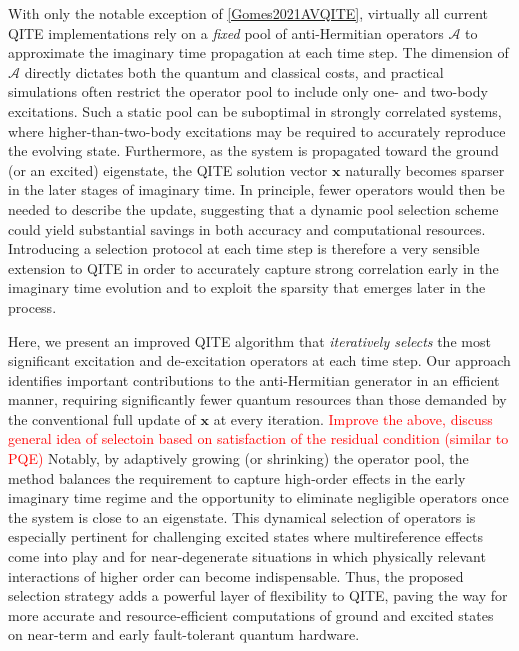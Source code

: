 \documentclass[aip,jcp,amsmath,amssymb, reprint]{revtex4-1}
\begin{document}
With only the notable exception of \ref{Gomes2021AVQITE}, virtually all current QITE implementations rely on a \textit{fixed} pool of anti-Hermitian operators $\mathcal{A}$ to approximate the imaginary time propagation at each time step.\cite{17,19,21,24} 
The dimension of $\mathcal{A}$ directly dictates both the quantum and classical costs, and practical simulations often restrict the operator pool to include only one- and two-body excitations. 
Such a static pool can be suboptimal in strongly correlated systems, where higher-than-two-body excitations may be required to accurately reproduce the evolving state. 
Furthermore, as the system is propagated toward the ground (or an excited) eigenstate, the QITE solution vector $\mathbf{x}$ naturally becomes sparser in the later stages of imaginary time. 
In principle, fewer operators would then be needed to describe the update, suggesting that a dynamic pool selection scheme could yield substantial savings in both accuracy and computational resources. 
Introducing a selection protocol at each time step is therefore a very sensible extension to QITE in order to accurately capture strong correlation early in the imaginary time evolution and to exploit the sparsity that emerges later in the process.

Here, we present an improved QITE algorithm that \textit{iteratively selects} the most significant excitation and de-excitation operators at each time step. 
Our approach identifies important contributions to the anti-Hermitian generator in an efficient manner, requiring significantly fewer quantum resources than those demanded by the conventional full update of $\mathbf{x}$ at every iteration. 
\textcolor{red}{Improve the above, discuss general idea of selectoin based on satisfaction of the residual condition (similar to PQE)}
Notably, by adaptively growing (or shrinking) the operator pool, the method balances the requirement to capture high-order effects in the early imaginary time regime and the opportunity to eliminate negligible operators once the system is close to an eigenstate. 
This dynamical selection of operators is especially pertinent for challenging excited states where multireference effects come into play and for near-degenerate situations in which physically relevant interactions of higher order can become indispensable. 
Thus, the proposed selection strategy adds a powerful layer of flexibility to QITE, paving the way for more accurate and resource-efficient computations of ground and excited states on near-term and early fault-tolerant quantum hardware.
\end{document}
